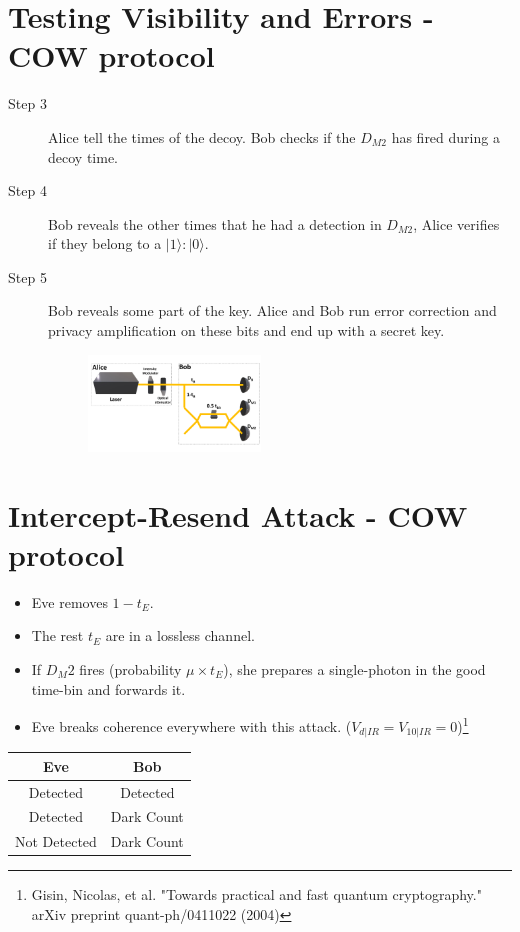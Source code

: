 \documentclass[1000pt]{article}
\newcommand{\mysection}[1]{\section*{\color{black}\sffamily #1}}%
\begin{document}
\mysection{\Huge\textbf{Testing Visibility and Errors - COW protocol}} \Large \vspace*{1cm}
\begin{description}

\item [Step 3] Alice tell the times of the decoy. Bob checks if the $D_{M2}$ has fired during a decoy time.

\item [Step 4] Bob reveals the other times that he had a detection in $D_{M2}$, Alice verifies if they belong to a $|1\rangle:|0\rangle$.

\item [Step 5] Bob reveals some part of the key. Alice and Bob run error correction and privacy amplification on these bits and end up with a secret key.

\begin{figure}[hbt]
    	\centering
    	\includegraphics[width=0.45\textwidth]{./figures/Full2.pdf}
    \end{figure}
\end{description}


\mysection{\Huge\textbf{Intercept-Resend Attack - COW protocol}} \large \vspace*{1cm}
\begin{itemize}
	\item Eve removes $1-t_E$.
	\item The rest $t_E$ are in a lossless channel.
	\item If $D_M2$ fires (probability $\mu \times t_E$), she prepares a single-photon in the good time-bin and forwards it.
	\item Eve breaks coherence everywhere with this attack. ($V_{d|IR} = V_{10|IR} =0$)\footnote{ \centering Gisin, Nicolas, et al. "Towards practical and fast quantum cryptography." arXiv preprint quant-ph/0411022 (2004)}
\end{itemize}
\begin{table}[hbt]
\centering
\begin{tabular}{|c|c|}
\hline
Eve          & Bob        \\ \hline
Detected     & Detected   \\ \hline
Detected     & Dark Count \\ \hline
Not Detected & Dark Count \\ \hline
\end{tabular}
\end{table}
	
\end{document}
